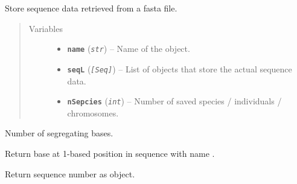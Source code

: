 \documentclass[letterpaper,10pt,english]{sphinxmanual}
\begin{document}
\begin{fulllineitems}
\label{fasta:libPoMo.fasta.FaSeq}
Store sequence data retrieved from a fasta file.
\begin{quote}\begin{description}
\item[{Variables}] \leavevmode\begin{itemize}
\item {} 
\textbf{\texttt{name}} (\emph{\texttt{str}}) -- Name of the  object.

\item {} 
\textbf{\texttt{seqL}} (\emph{\texttt{{[}Seq{]}}}) -- List of {\hyperref[seqbase:libPoMo.seqbase.Seq]{}}
objects that store the actual sequence data.

\item {} 
\textbf{\texttt{nSepcies}} (\emph{\texttt{int}}) -- Number of saved species / individuals /
chromosomes.

\end{itemize}

\end{description}\end{quote}

\begin{fulllineitems}
\label{fasta:libPoMo.fasta.FaSeq.get_distance}
Number of segregating bases.

\end{fulllineitems}


\begin{fulllineitems}
\label{fasta:libPoMo.fasta.FaSeq.get_seq_base}
Return base at 1-based position  in sequence with name
.

\end{fulllineitems}


\begin{fulllineitems}
\label{fasta:libPoMo.fasta.FaSeq.get_seq_by_id}
Return sequence number  as  object.


\end{fulllineitems}
\end{fulllineitems}
\end{document}
